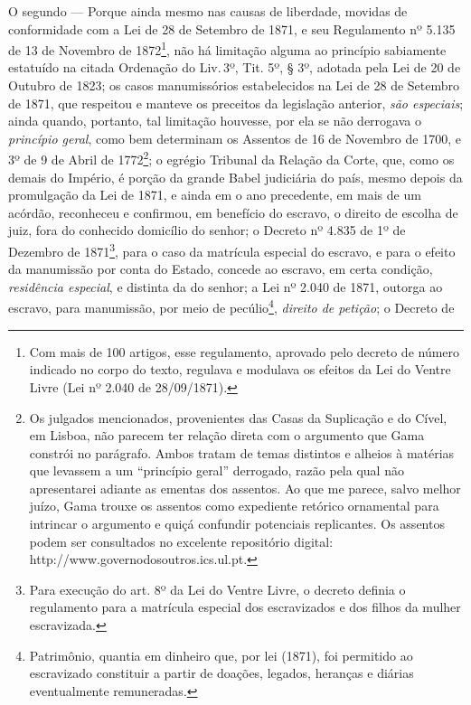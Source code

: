 O segundo --- Porque ainda mesmo nas causas de liberdade, movidas de
conformidade com a Lei de 28 de Setembro de 1871, e seu Regulamento nº
5.135 de 13 de Novembro de 1872\footnote{Com mais de 100 artigos, esse
  regulamento, aprovado pelo decreto de número indicado no corpo do
  texto, regulava e modulava os efeitos da Lei do Ventre Livre (Lei nº
  2.040 de 28/09/1871).}, não há limitação alguma ao princípio
sabiamente estatuído na citada Ordenação do Liv.\,3º, Tit. 5º, § 3º,
adotada pela Lei de 20 de Outubro de 1823; os casos manumissórios
estabelecidos na Lei de 28 de Setembro de 1871, que respeitou e manteve
os preceitos da legislação anterior, \emph{são especiais}; ainda quando,
portanto, tal limitação houvesse, por ela se não derrogava o
\emph{princípio geral}, como bem determinam os Assentos de 16 de
Novembro de 1700, e 3º de 9 de Abril de 1772\footnote{Os julgados
  mencionados, provenientes das Casas da Suplicação e do Cível, em
  Lisboa, não parecem ter relação direta com o argumento que Gama
  constrói no parágrafo. Ambos tratam de temas distintos e alheios à
  matérias que levassem a um ``princípio geral'' derrogado, razão pela qual
  não apresentarei adiante as ementas dos assentos. Ao que me parece,
  salvo melhor juízo, Gama trouxe os assentos como expediente retórico
  ornamental para intrincar o argumento e quiçá confundir potenciais
  replicantes. Os assentos podem ser consultados no excelente
  repositório digital: http://www.governodosoutros.ics.ul.pt.}; o
egrégio Tribunal da Relação da Corte, que, como os demais do Império, é
porção da grande Babel judiciária do país, mesmo depois da promulgação
da Lei de 1871, e ainda em o ano precedente, em mais de um acórdão,
reconheceu e confirmou, em benefício do escravo, o direito de escolha de
juiz, fora do conhecido domicílio do senhor; o Decreto nº 4.835 de 1º de
Dezembro de 1871\footnote{Para execução do art. 8º da Lei do Ventre
  Livre, o decreto definia o regulamento para a matrícula especial dos
  escravizados e dos filhos da mulher escravizada.}, para o caso da
matrícula especial do escravo, e para o efeito da manumissão por conta
do Estado, concede ao escravo, em certa condição, \emph{residência
especial}, e distinta da do senhor; a Lei nº 2.040 de 1871, outorga ao
escravo, para manumissão, por meio de pecúlio\footnote{Patrimônio,
  quantia em dinheiro que, por lei (1871), foi permitido ao escravizado
  constituir a partir de doações, legados, heranças e diárias
  eventualmente remuneradas.}, \emph{direito de petição}; o Decreto de
